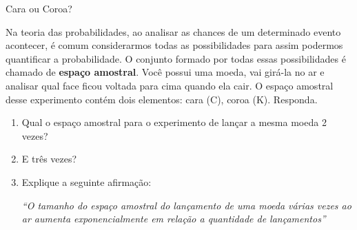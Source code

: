 \begin{task}{Cara ou Coroa?}

Na teoria das probabilidades, ao analisar as chances de um determinado evento acontecer, é comum considerarmos todas as possibilidades para assim podermos quantificar a probabilidade. O conjunto formado por todas essas possibilidades é chamado de \textbf{espaço amostral}.
Você possui uma moeda, vai girá-la no ar e analisar qual face ficou voltada para cima quando ela cair. O espaço amostral desse experimento contém dois elementos: {cara (C), coroa (K)}. Responda.

\begin{enumerate}

\item{}
Qual o espaço amostral para o experimento de lançar a mesma moeda 2 vezes?

\item{}
E três vezes?

\item{}
Explique a seguinte afirmação:

\textit{“O tamanho do espaço amostral do lançamento de uma moeda várias vezes ao ar aumenta exponencialmente em relação a quantidade de lançamentos”}

\end{enumerate}

\end{task}

